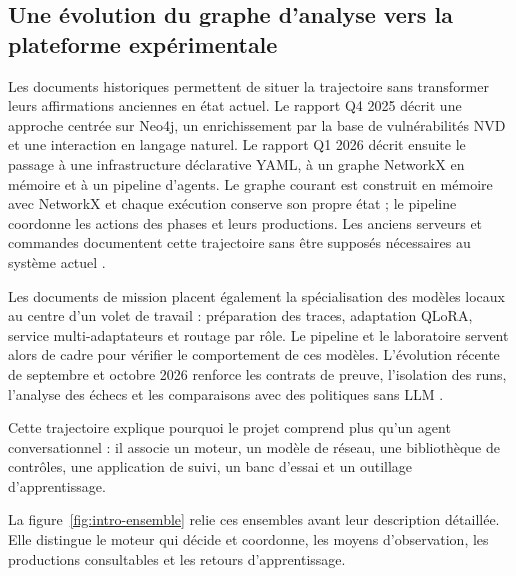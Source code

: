 \documentclass[11pt,a4paper]{article}
\begin{document}
\subsection{Une évolution du graphe d'analyse vers la plateforme expérimentale}
Les documents historiques permettent de situer la trajectoire sans transformer
leurs affirmations anciennes en état actuel. Le rapport Q4 2025 décrit une
approche centrée sur Neo4j, un enrichissement par la base de vulnérabilités NVD
et une interaction en langage naturel. Le rapport Q1 2026 décrit ensuite le
passage à une infrastructure déclarative YAML, à un graphe NetworkX en mémoire
et à un pipeline d'agents. Le graphe courant est construit en mémoire avec
NetworkX et chaque exécution conserve son propre état ; le pipeline coordonne
les actions des phases et leurs productions. Les anciens serveurs et commandes
documentent cette trajectoire sans être supposés nécessaires au système actuel \cite{intro-q4,intro-q1}.

Les documents de mission placent également la spécialisation des modèles
locaux au centre d'un volet de travail : préparation des traces, adaptation
QLoRA, service multi-adaptateurs et routage par rôle. Le pipeline et le
laboratoire servent alors de cadre pour vérifier le comportement de ces
modèles. L'évolution récente de septembre et octobre 2026 renforce les contrats
de preuve, l'isolation des runs, l'analyse des échecs et les comparaisons avec
des politiques sans LLM \cite{intro-mission,intro-phases,intro-research}.

Cette trajectoire explique pourquoi le projet comprend plus qu'un agent
conversationnel : il associe un moteur, un modèle de réseau, une bibliothèque
de contrôles, une application de suivi, un banc d'essai et un outillage
d'apprentissage.

La figure~\ref{fig:intro-ensemble} relie ces ensembles avant leur description
détaillée. Elle distingue le moteur qui décide et coordonne, les moyens
d'observation, les productions consultables et les retours d'apprentissage.
\end{document}
